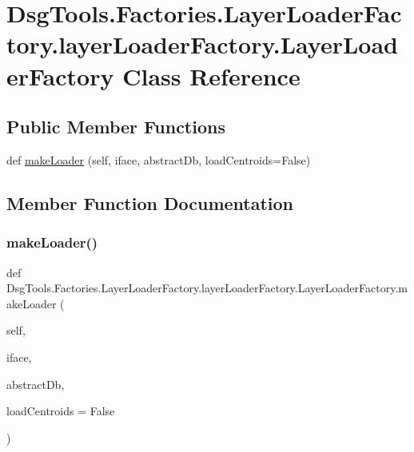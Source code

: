 \hypertarget{class_dsg_tools_1_1_factories_1_1_layer_loader_factory_1_1layer_loader_factory_1_1_layer_loader_factory}{}\section{Dsg\+Tools.\+Factories.\+Layer\+Loader\+Factory.\+layer\+Loader\+Factory.\+Layer\+Loader\+Factory Class Reference}
\label{class_dsg_tools_1_1_factories_1_1_layer_loader_factory_1_1layer_loader_factory_1_1_layer_loader_factory}
\subsection*{Public Member Functions}
\begin{DoxyCompactItemize}
\item 
def \mbox{\hyperlink{class_dsg_tools_1_1_factories_1_1_layer_loader_factory_1_1layer_loader_factory_1_1_layer_loader_factory_a436723f8f8cbb9eeb1c53fd364b06c05}{make\+Loader}} (self, iface, abstract\+Db, load\+Centroids=False)
\end{DoxyCompactItemize}


\subsection{Member Function Documentation}
\mbox{\label{class_dsg_tools_1_1_factories_1_1_layer_loader_factory_1_1layer_loader_factory_1_1_layer_loader_factory_a436723f8f8cbb9eeb1c53fd364b06c05}} 
\subsubsection{\texorpdfstring{make\+Loader()}{makeLoader()}}
{\footnotesize\ttfamily def Dsg\+Tools.\+Factories.\+Layer\+Loader\+Factory.\+layer\+Loader\+Factory.\+Layer\+Loader\+Factory.\+make\+Loader (\begin{DoxyParamCaption}\item[{}]{self,  }\item[{}]{iface,  }\item[{}]{abstract\+Db,  }\item[{}]{load\+Centroids = {\ttfamily False} }\end{DoxyParamCaption})}

